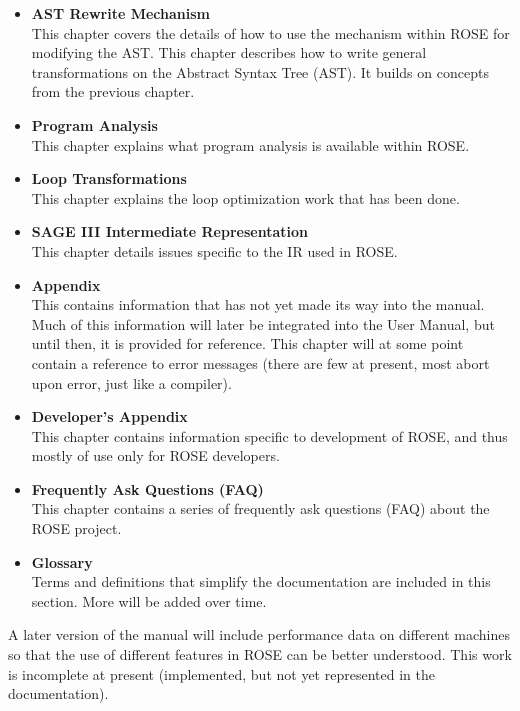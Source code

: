 \begin{itemize}
   \item {\bf AST Rewrite Mechanism} \\ This chapter covers the details of how to use the 
      mechanism within ROSE for modifying the AST. This chapter describes how to write
      general transformations on the Abstract Syntax Tree (AST).   It builds on concepts
      from the previous chapter.

   \item {\bf Program Analysis} \\
      This chapter explains what program analysis is available within ROSE.

   \item {\bf Loop Transformations} \\
      This chapter explains the loop optimization work that has been done.

   \item {\bf SAGE III Intermediate Representation} \\
      This chapter details issues specific to the IR used in ROSE.

   \item {\bf Appendix} \\ This contains information that has not yet made its way
      into the manual.  Much of this information will later be integrated into the 
      User Manual, but until then, it is provided for reference.  This chapter will at some point 
      contain a reference to error messages (there are few at present, most abort upon
      error, just like a compiler).

   \item {\bf Developer's Appendix} \\
      This chapter contains information specific to development of ROSE, and thus mostly 
    of use only for ROSE developers.

   \item {\bf Frequently Ask Questions (FAQ)} \\
      This chapter contains a series of frequently ask questions (FAQ) about the ROSE project.

   \item {\bf Glossary} \\ 
      Terms and definitions that simplify the documentation are included in this section. 
      More will be added over time.

\end{itemize}

   A later version of the manual will include performance data on different machines
so that the use of different features in ROSE can be better understood.  This
work is incomplete at present (implemented, but not yet represented in the documentation).










